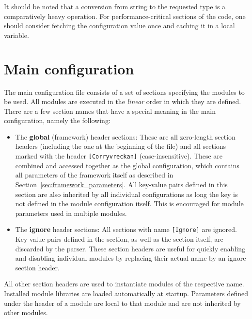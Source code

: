 \begin{warning}
    It should be noted that a conversion from string to the requested type is a comparatively heavy operation.
    For performance-critical sections of the code, one should consider fetching the configuration value once and caching it in a local variable.
\end{warning}

\section{Main configuration}
\label{sec:main_config}
The main configuration file consists of a set of sections specifying the modules to be used.
All modules are executed in the \emph{linear} order in which they are defined.
There are a few section names that have a special meaning in the main configuration, namely the following:
\begin{itemize}
\item The \textbf{global} (framework) header sections: These are all zero-length section headers (including the one at the beginning of the file) and all sections marked with the header \texttt{[Corryvreckan]} (case-insensitive).
These are combined and accessed together as the global configuration, which contains all parameters of the framework itself as described in Section~\ref{sec:framework_parameters}.
All key-value pairs defined in this section are also inherited by all individual configurations as long the key is not defined in the module configuration itself. This is encouraged for module parameters used in multiple modules.
\item The \textbf{ignore} header sections: All sections with name \texttt{[Ignore]} are ignored.
Key-value pairs defined in the section, as well as the section itself, are discarded by the parser.
These section headers are useful for quickly enabling and disabling individual modules by replacing their actual name by an ignore section header.
\end{itemize}

All other section headers are used to instantiate modules of the respective name.
Installed module libraries are loaded automatically at startup.
Parameters defined under the header of a module are local to that module and are not inherited by other modules.

